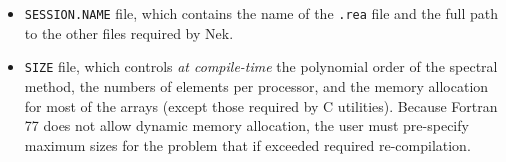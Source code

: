 \documentclass[10pt]{article}
\numberwithin{equation}{section} %
\begin{document}
\begin{itemize}
\item {\tt SESSION.NAME} file, which contains the name of the {\tt .rea} file and the full path to the other files required by Nek. 

\item {\tt SIZE} file, which controls {\it at compile-time} the polynomial order of the spectral method, the numbers of elements per processor, and the memory allocation for most of the arrays (except those required by C utilities). Because Fortran 77 does not allow dynamic memory allocation, the user must pre-specify maximum sizes for the problem that if exceeded required re-compilation. 

\end{itemize}
\end{document}

